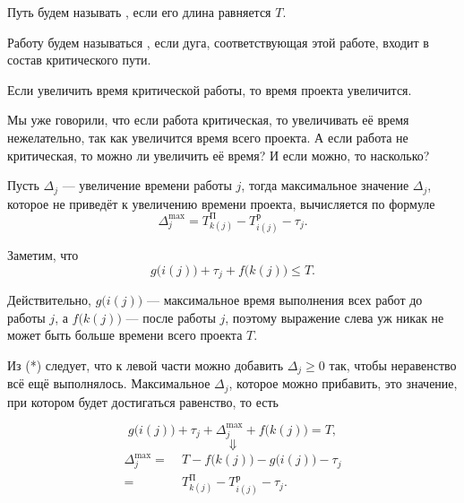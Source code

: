 
Путь будем называть , если его длина равняется $T$.


Работу будем называться , если дуга, соответствующая этой работе, входит в состав критического пути.

\remark

Если увеличить время критической работы, то время проекта увеличится.

\remark

Мы уже говорили, что если работа критическая, то увеличивать её время нежелательно, так как увеличится время всего проекта. А если работа не критическая, то можно ли увеличить её время? И если можно, то насколько?

\fact

Пусть $\Delta_j$ --- увеличение времени работы $j$, тогда максимальное значение $\Delta_j$, которое не приведёт к увеличению времени проекта, вычисляется по формуле
\[
\Delta_j^{\max} = T_{k(j)}^{\text{П}} - T_{i(j)}^{\text{р}} - \tau_j.
\]

\prooof

Заметим, что
\[
g\big(i(j)\big) + \tau_j + f\big(k(j)\big) \le T\tag{*}.
\]

Действительно, $g\big(i(j)\big)$ --- максимальное время выполнения всех работ до работы $j$, а $f\big(k(j)\big)$ --- после работы $j$, поэтому выражение слева уж никак не может быть больше времени всего проекта $T$.

Из (*) следует, что к левой части можно добавить $\Delta_j \ge 0$ так, чтобы неравенство всё ещё выполнялось. Максимальное $\Delta_j$, которое можно прибавить, это значение, при котором будет достигаться равенство, то есть

\[
g\big(i(j)\big) + \tau_j + \Delta_j^{\max} + f\big(k(j)\big) = T,
\]
\[
\Downarrow
\]
\begin{align*}
	\Delta_j^{\max} =& \; T - 	f\big(k(j)\big) - g\big(i(j)\big) - \tau_j \\
	=& \; T_{k(j)}^{\text{П}} - T_{i(j)}^{\text{р}} - \tau_j.
\end{align*}

